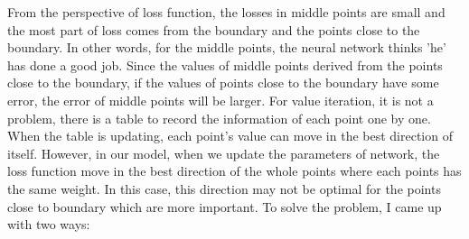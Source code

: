 \documentclass[11pt]{amsart}
\begin{document}
From the perspective of loss function, the losses in middle points are small and the most part of loss comes from the boundary and the points close to the boundary. In other words, for the middle points, the neural network thinks 'he' has done a good job. Since the values of middle points derived from the points close to the boundary, if the values of points close to the boundary have some error, the error of middle points will be larger. For value iteration, it is not a problem, there is a table to record the information of each point one by one. When the table is updating, each point's value can move in the best direction of itself. However, in our model, when we update the parameters of network, the loss function move in the best direction of the whole points where each points has the same weight. In this case, this direction may not be optimal for the points close to boundary which are more important. To solve the problem, I came up with two ways:
\end{document}

